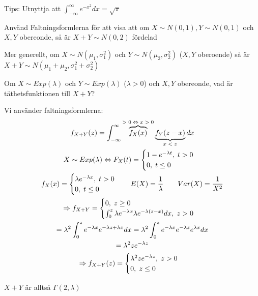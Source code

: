 \noindent Tips: Utnyttja att $\int_{-\infty}^{\infty}e^{-x^2}dx = \sqrt{\pi}$\par
\noindent Använd Faltningsformlerna för att visa att om $X\sim N(0,1), Y\sim N(0,1)$ och $X,Y$ obereonde, så är $X+Y\sim N(0,2)$ fördelad\par
\noindent Mer generellt, om $X\sim N(\mu_1,\sigma_1^2)$ och $Y\sim N(\mu_2,\sigma_2^2)$ ($X,Y$ oberoende) så är $X+Y\sim N(\mu_1+\mu_2, \sigma_1^2+\sigma_2^2)$
\par\bigskip
\noindent Om $X\sim Exp(\lambda)$ och $Y\sim Exp(\lambda)$ ($\lambda>0$) och $X,Y$ obereonde, vad är täthetsfunktionen till $X+Y$?\par
\noindent Vi använder faltningsformlerna:
\begin{equation*}
  \begin{gathered}
    f_{X+Y}(z) = \int_{-\infty}^{\infty}\overbrace{f_X(x)}^{\text{$>0\Leftrightarrow x>0$}}\underbrace{f_Y(z-x)}_{\text{$x<z$}}dx\\
    X\sim Exp(\lambda)\Leftrightarrow F_X(t) = \begin{cases}1-e^{-\lambda t},\; t>0\\0,\;t\leq0\end{cases}\\
    f_X(x) = \begin{cases}\lambda e^{-\lambda x},\;t>0\\0,\;t\leq0\end{cases}\quad E(X) = \dfrac{1}{\lambda}\qquad Var(X) = \dfrac{1}{X^2}\\
    \Rightarrow f_{X+Y} = \begin{cases}0,\; z\geq0\\\int_{0}^{z}\lambda e^{-\lambda x}\lambda e^{-\lambda(z-x)}dx,\;z>0\end{cases}\\
    =\lambda^2\int_{0}^{z}e^{-\lambda x}e^{-\lambda z+\lambda x}dx = \lambda^2\int_{0}^{z}e^{-\lambda x}e^{-\lambda z}e^{\lambda x}dx\\
     = \lambda^2 ze^{-\lambda z}\\
     \Rightarrow f_{X+Y}(z) = \begin{cases}\lambda^2 ze^{-\lambda z},\;z>0\\0,\;z\leq0\end{cases}
  \end{gathered}
\end{equation*}
\par\bigskip
\noindent $X+Y$ är alltså $\Gamma(2,\lambda)$
\par\bigskip
